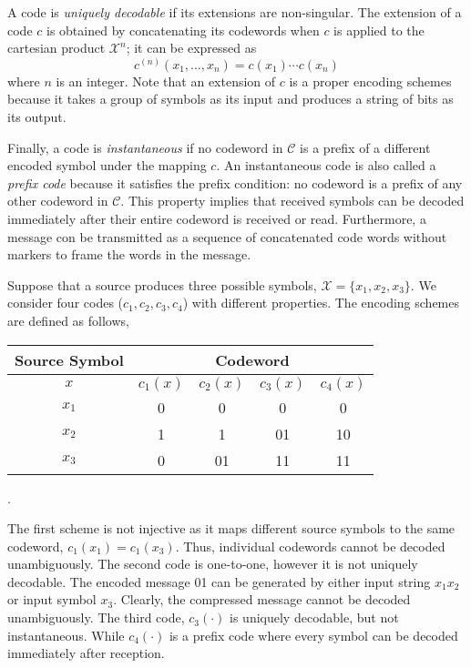 A code is \emph{uniquely decodable} if its extensions are non-singular.
The extension of a code $c$ is obtained by concatenating its codewords when $c$ is applied to the cartesian product $\mathcal{X}^n$; it can be expressed as
\begin{equation*}
c^{(n)} (x_1, \ldots, x_n) = c(x_1) \cdots c(x_n)
\end{equation*}
where $n$ is an integer.
Note that an extension of $c$ is a proper encoding schemes because it takes a group of symbols as its input and produces a string of bits as its output.

Finally, a code is \emph{instantaneous} if no codeword in $\mathcal{C}$ is a prefix of a different encoded symbol under the mapping $c$.
An instantaneous code is also called a \emph{prefix code} because it satisfies the prefix condition: no codeword is a prefix of any other codeword in $\mathcal{C}$.
This property implies that received symbols can be decoded immediately after their entire codeword is received or read.
Furthermore, a message con be transmitted as a sequence of concatenated code words without markers to frame the words in the message.

\begin{example}
Suppose that a source produces three possible symbols, $\mathcal{X} = \{ x_1, x_2, x_3 \}$.
We consider four codes ($c_1, c_2, c_3, c_4$) with different properties.
The encoding schemes are defined as follows,
\begin{center}
\begin{tabular}{|c|c|c|c|c|}
\hline
Source Symbol & \multicolumn{4}{c|}{Codeword} \\
\hline
$x$ & $c_1(x)$ & $c_2(x)$ & $c_3(x)$ & $c_4(x)$ \\
\hline
$x_1$ & 0 & 0 & 0 & 0 \\
$x_2$ & 1 & 1 & 01 & 10 \\
$x_3$ & 0 & 01 & 11 & 11 \\
\hline
\end{tabular} .
\end{center}
The first scheme is not injective as it maps different source symbols to the same codeword, $c_1(x_1) = c_1(x_3)$.
Thus, individual codewords cannot be decoded unambiguously.
The second code is one-to-one, however it is not uniquely decodable.
The encoded message 01 can be generated by either input string $x_1 x_2$ or input symbol $x_3$.
Clearly, the compressed message cannot be decoded unambiguously.
The third code, $c_3(\cdot)$ is uniquely decodable, but not instantaneous.
While $c_4(\cdot)$ is a prefix code where every symbol can be decoded immediately after reception.
\end{example}

